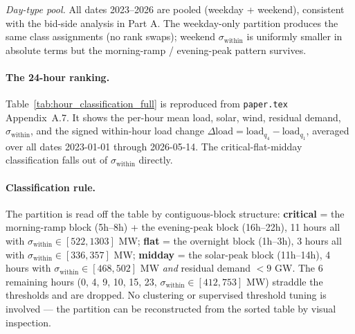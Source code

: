 \documentclass[11pt,a4paper]{article}
\newcommand{\code}[1]{\nolinkurl{#1}}
\begin{document}
\emph{Day-type pool.} All dates 2023--2026 are pooled (weekday + weekend), consistent with the bid-side analysis in Part A. The weekday-only partition produces the same class assignments (no rank swaps); weekend $\sigma_{\text{within}}$ is uniformly smaller in absolute terms but the morning-ramp / evening-peak pattern survives.

\paragraph{The 24-hour ranking.}
Table~\ref{tab:hour_classification_full} is reproduced from \code{paper.tex} Appendix~A.7. It shows the per-hour mean load, solar, wind, residual demand, $\sigma_{\text{within}}$, and the signed within-hour load change $\Delta\text{load} = \text{load}_{q_4} - \text{load}_{q_1}$, averaged over all dates 2023-01-01 through 2026-05-14. The critical-flat-midday classification falls out of $\sigma_{\text{within}}$ directly.

\begin{table}[H]
\centering\footnotesize
\caption{\textbf{Hour-of-day classification metrics, Spain 2023--2026} (ENTSO-E A65 + A75, 15-min ISP, $n \approx 3.4$ years of daily observations per hour). The classifier is $\sigma_{\text{within}}$ (column 6, MW). Critical hours: $\sigma_{\text{within}} \in [522, 1303]$. Flat hours: $\sigma_{\text{within}} \in [336, 357]$. Midday: $\sigma_{\text{within}} \in [468, 502]$ --- intermediate, but excluded for the separate reason discussed below. Dropped (transition) hours sit at the regime boundaries. \textit{Year-stability:} across the 3 full years 2023, 2024, 2025 (computed separately), the critical-set min $\sigma_{\text{within}}$ across years is 530 MW, exceeding the flat-set max (387 MW) by $1.4\times$; no within-class swaps across years.}
\label{tab:hour_classification_full}
\newcommand{\critrow}{\rowcolor{red!10}}%
\newcommand{\flatrow}{\rowcolor{blue!10}}%

\end{table}

\paragraph{Classification rule.}
The partition is read off the table by contiguous-block structure: \textbf{critical} = the morning-ramp block (5h--8h) + the evening-peak block (16h--22h), 11 hours all with $\sigma_{\text{within}} \in [522, 1303]$ MW; \textbf{flat} = the overnight block (1h--3h), 3 hours all with $\sigma_{\text{within}} \in [336, 357]$ MW; \textbf{midday} = the solar-peak block (11h--14h), 4 hours with $\sigma_{\text{within}} \in [468, 502]$ MW \emph{and} residual demand $< 9$ GW. The 6 remaining hours (0, 4, 9, 10, 15, 23, $\sigma_{\text{within}} \in [412, 753]$ MW) straddle the thresholds and are dropped. No clustering or supervised threshold tuning is involved --- the partition can be reconstructed from the sorted table by visual inspection.
\end{document}
